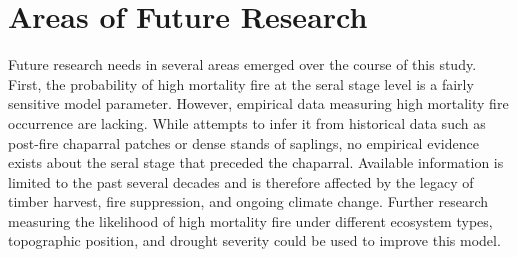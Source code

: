 








\section{Areas of Future Research}
Future research needs in several areas emerged over the course of this study. First, the probability of high mortality fire at the seral stage level is a fairly sensitive model parameter. However, empirical data measuring high mortality fire occurrence are lacking. While \citet{Baker2014} attempts to infer it from historical data such as post-fire chaparral patches or dense stands of saplings, no empirical evidence exists about the seral stage that preceded the chaparral. Available information is limited to the past several decades and is therefore affected by the legacy of timber harvest, fire suppression, and ongoing climate change. Further research measuring the likelihood of high mortality fire under different ecosystem types, topographic position, and drought severity could be used to improve this model.

